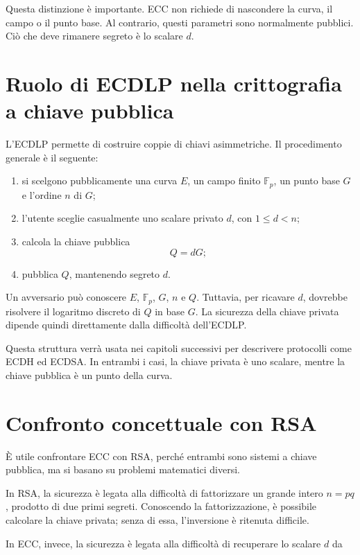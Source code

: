 \documentclass[12pt,a4paper,oneside]{report}
\begin{document}
Questa distinzione è importante. ECC non richiede di nascondere la curva, il campo o il punto base. Al contrario, questi parametri sono normalmente pubblici. Ciò che deve rimanere segreto è lo scalare \(d\).

\section{Ruolo di ECDLP nella crittografia a chiave pubblica}

L'ECDLP permette di costruire coppie di chiavi asimmetriche. Il procedimento generale è il seguente:

\begin{enumerate}
    \item si scelgono pubblicamente una curva \(E\), un campo finito \(\mathbb{F}_p\), un punto base \(G\) e l'ordine \(n\) di \(G\);
    \item l'utente sceglie casualmente uno scalare privato \(d\), con \(1 \leq d < n\);
    \item calcola la chiave pubblica
    \[
    Q=dG;
    \]
    \item pubblica \(Q\), mantenendo segreto \(d\).
\end{enumerate}

Un avversario può conoscere \(E\), \(\mathbb{F}_p\), \(G\), \(n\) e \(Q\). Tuttavia, per ricavare \(d\), dovrebbe risolvere il logaritmo discreto di \(Q\) in base \(G\). La sicurezza della chiave privata dipende quindi direttamente dalla difficoltà dell'ECDLP.

Questa struttura verrà usata nei capitoli successivi per descrivere protocolli come ECDH ed ECDSA. In entrambi i casi, la chiave privata è uno scalare, mentre la chiave pubblica è un punto della curva.

\section{Confronto concettuale con RSA}

È utile confrontare ECC con RSA, perché entrambi sono sistemi a chiave pubblica, ma si basano su problemi matematici diversi.

In RSA, la sicurezza è legata alla difficoltà di fattorizzare un grande intero \(n=pq\), prodotto di due primi segreti. Conoscendo la fattorizzazione, è possibile calcolare la chiave privata; senza di essa, l'inversione è ritenuta difficile.

In ECC, invece, la sicurezza è legata alla difficoltà di recuperare lo scalare \(d\) da
\end{document}
